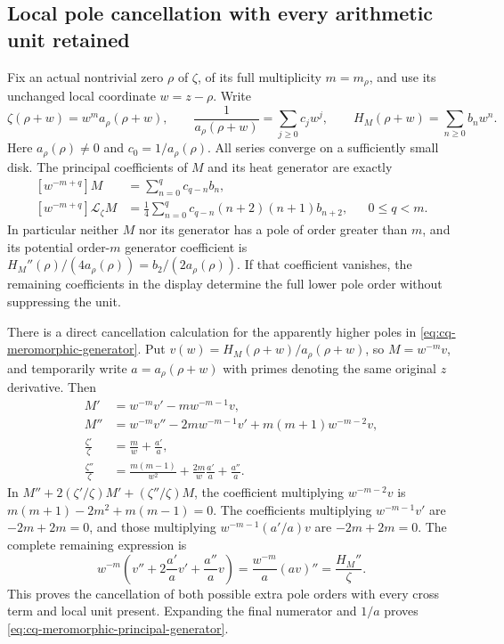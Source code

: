 \subsection{Local pole cancellation with every arithmetic unit retained}
\label{sec:cq-meromorphic-local-heat}
Fix an actual nontrivial zero $\rho$ of $\zeta$, of its full
multiplicity $m=m_\rho$, and use its unchanged local coordinate
$w=z-\rho$. Write
\begin{equation}\label{eq:cq-meromorphic-local-data}
 \zeta(\rho+w)=w^m a_\rho(\rho+w),\qquad
 \frac1{a_\rho(\rho+w)}=\sum_{j\geq0}c_jw^j,\qquad
 H_M(\rho+w)=\sum_{n\geq0}b_nw^n.
\end{equation}
Here $a_\rho(\rho)\ne0$ and $c_0=1/a_\rho(\rho)$.
All series converge on a sufficiently small disk. The principal
coefficients of $M$ and its heat generator are exactly
\begin{equation}\label{eq:cq-meromorphic-principal-generator}
 \begin{aligned}
 [w^{-m+q}]M
   &=\sum_{n=0}^{q}c_{q-n}b_n,\\
 [w^{-m+q}]\mathcal L_\zeta M
   &=\frac14\sum_{n=0}^{q}
                c_{q-n}(n+2)(n+1)b_{n+2},
       &&0\leq q<m.
 \end{aligned}
\end{equation}
In particular neither $M$ nor its generator has a pole of order
greater than $m$, and its potential order-$m$ generator coefficient
is $H_M''(\rho)/(4a_\rho(\rho))=b_2/(2a_\rho(\rho))$.
If that coefficient vanishes, the remaining coefficients in the
display determine the full lower pole order without suppressing
the unit.

There is a direct cancellation calculation for the apparently
higher poles in \eqref{eq:cq-meromorphic-generator}. Put
$v(w)=H_M(\rho+w)/a_\rho(\rho+w)$, so $M=w^{-m}v$,
and temporarily write $a=a_\rho(\rho+w)$ with primes denoting
the same original $z$ derivative. Then
\[
 \begin{aligned}
 M'&=w^{-m}v'-mw^{-m-1}v,\\
 M''&=w^{-m}v''-2mw^{-m-1}v'
                         +m(m+1)w^{-m-2}v,\\
 \frac{\zeta'}{\zeta}&=\frac m w+\frac{a'}a,\\
 \frac{\zeta''}{\zeta}
   &=\frac{m(m-1)}{w^2}+\frac{2m}{w}\frac{a'}a
                              +\frac{a''}a.
 \end{aligned}
\]
In $M''+2(\zeta'/\zeta)M'+(\zeta''/\zeta)M$, the
coefficient multiplying $w^{-m-2}v$ is
$m(m+1)-2m^2+m(m-1)=0$. The coefficients multiplying
$w^{-m-1}v'$ are $-2m+2m=0$, and those multiplying
$w^{-m-1}(a'/a)v$ are $-2m+2m=0$. The complete remaining
expression is
\[
 w^{-m}\left(v''+2\frac{a'}a v'+\frac{a''}a v\right)
 =\frac{w^{-m}}a(av)''=\frac{H_M''}{\zeta}.
\]
This proves the cancellation of both possible extra pole orders
with every cross term and local unit present. Expanding the final
numerator and $1/a$ proves
\eqref{eq:cq-meromorphic-principal-generator}.

